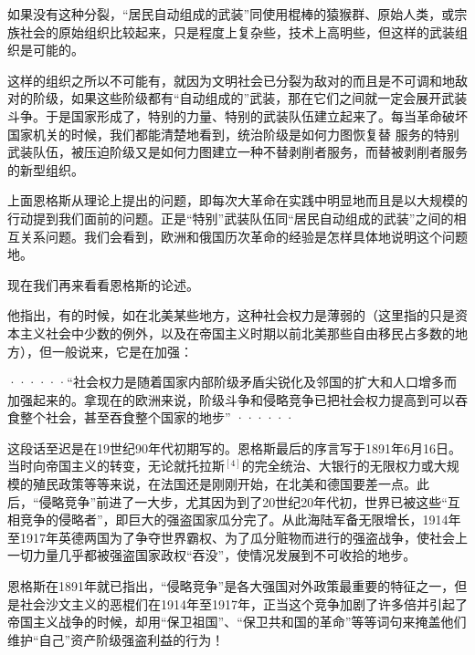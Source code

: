 如果没有这种分裂，“居民自动组成的武装”同使用棍棒的猿猴群、原始人类，或宗族社会的原始组织比较起来，只是程度上复杂些，技术上高明些，但这样的武装组织是可能的。

这样的组织之所以不可能有，就因为文明社会已分裂为敌对的而且是不可调和地敌对的阶级，如果这些阶级都有“自动组成的”武装，那在它们之间就一定会展开武装斗争。于是国家形成了，特别的力量、特别的武装队伍建立起来了。每当革命破坏国家机关的时候，我们都能清楚地看到，统治阶级是如何力图恢复替 服务的特别武装队伍，被压迫阶级又是如何力图建立一种不替剥削者服务，而替被剥削者服务的新型组织。

上面恩格斯从理论上提出的问题，即每次大革命在实践中明显地而且是以大规模的行动提到我们面前的问题。正是“特别”武装队伍同“居民自动组成的武装”之间的相互关系问题。我们会看到，欧洲和俄国历次革命的经验是怎样具体地说明这个问题地。

现在我们再来看看恩格斯的论述。

他指出，有的时候，如在北美某些地方，这种社会权力是薄弱的（这里指的只是资本主义社会中少数的例外，以及在帝国主义时期以前北美那些自由移民占多数的地方），但一般说来，它是在加强：

\pskip
\leftskip=10mm
\small

······“社会权力是随着国家内部阶级矛盾尖锐化及邻国的扩大和人口增多而加强起来的。拿现在的欧洲来说，阶级斗争和侵略竞争已把社会权力提高到可以吞食整个社会，甚至吞食整个国家的地步” ······

\leftskip=0mm
\normalsize
\pskip

这段话至迟是在19世纪90年代初期写的。恩格斯最后的序言写于1891年6月16日。当时向帝国主义的转变，无论就托拉斯$^{[4]}$的完全统治、大银行的无限权力或大规模的殖民政策等等来说，在法国还是刚刚开始，在北美和德国要差一点。此后，“侵略竞争”前进了一大步，尤其因为到了20世纪20年代初，世界已被这些“互相竞争的侵略者”，即巨大的强盗国家瓜分完了。从此海陆军备无限增长，1914年至1917年英德两国为了争夺世界霸权、为了瓜分赃物而进行的强盗战争，使社会上一切力量几乎都被强盗国家政权“吞没”，使情况发展到不可收拾的地步。

恩格斯在1891年就已指出，“侵略竞争”是各大强国对外政策最重要的特征之一，但是社会沙文主义的恶棍们在1914年至1917年，正当这个竞争加剧了许多倍并引起了帝国主义战争的时候，却用“保卫祖国”、“保卫共和国的革命”等等词句来掩盖他们维护“自己”资产阶级强盗利益的行为！





